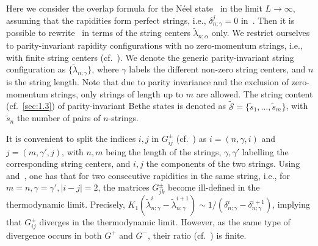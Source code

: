 \documentclass[11pt]{iopart}
\begin{document}
Here we consider the overlap formula for the N\'eel state~ in the 
limit $L\to\infty$, assuming that the rapidities form perfect strings, i.e., 
$\delta_{n;\gamma}^j=0$ in~. Then it is possible to 
rewrite~ in terms of the string centers $\tilde\lambda_{n;\alpha}$ 
only. We restrict ourselves to parity-invariant rapidity configurations with no 
zero-momentum strings, i.e., with finite string centers (cf.~). 
We denote the generic parity-invariant string configuration as $\{\tilde
\lambda_{n;\gamma}\}$, where $\gamma$ labels the different non-zero string 
centers, and $n$ is the string length. Note that due to parity invariance and 
the exclusion of zero-momentum strings, only strings of length up to $m$ are 
allowed. The string 
content (cf.~\ref{sec:1.3}) of parity-invariant Bethe states is denoted as 
$\widetilde{\mathcal S}=\{\tilde s_1,\dots,\tilde s_{m}\}$, with $\tilde s_n$ 
the number of pairs of $n$-strings. 

It is convenient to split the indices $i,j$ in $G^\pm_{ij}$ (cf.~) as 
$i=(n,\gamma,i)$ and $j=(m,\gamma',j)$, with $n,m$ being the length of the strings, 
$\gamma,\gamma'$ labelling the corresponding string centers, and $i,j$ the components 
of the two strings. Using~ and~, one has that for two consecutive 
rapidities in the same string, i.e., for $m=n,\gamma=\gamma',|i-j|=2$, the matrices 
$G^{\pm}_{jk}$ become ill-defined in the thermodynamic limit. Precisely, $K_{1}(\tilde
\lambda_{n;\gamma}^i-\tilde\lambda_{n;\gamma}^{i+1})\sim 1/(\delta_{n;\gamma}^i-
\delta_{n;\gamma}^{i+1})$, implying that $G_{ij}^\pm$ diverges in the thermodynamic 
limit. However, as the same type of divergence occurs in both $G^+$ and $G^-$, their 
ratio (cf.~) is finite. 
\end{document}
